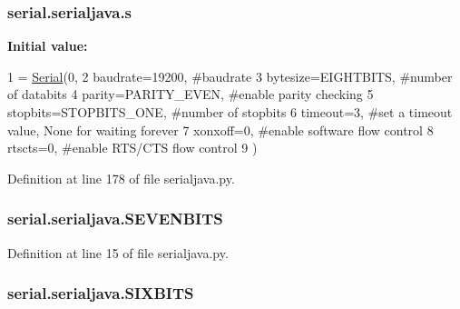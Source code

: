 \subsubsection[{\texorpdfstring{s}{s}}]{\setlength{\rightskip}{0pt plus 5cm}serial.\+serialjava.\+s}\hypertarget{namespaceserial_1_1serialjava_aa3340e982508ffb757dae29fd0a7c21c}{}\label{namespaceserial_1_1serialjava_aa3340e982508ffb757dae29fd0a7c21c}
{\bfseries Initial value\+:}
\begin{DoxyCode}
1 = \hyperlink{classserial_1_1serialjava_1_1_serial}{Serial}(0,
2                  baudrate=19200,        \textcolor{comment}{#baudrate}
3                  bytesize=EIGHTBITS,    \textcolor{comment}{#number of databits}
4                  parity=PARITY\_EVEN,    \textcolor{comment}{#enable parity checking}
5                  stopbits=STOPBITS\_ONE, \textcolor{comment}{#number of stopbits}
6                  timeout=3,             \textcolor{comment}{#set a timeout value, None for waiting forever}
7                  xonxoff=0,             \textcolor{comment}{#enable software flow control}
8                  rtscts=0,              \textcolor{comment}{#enable RTS/CTS flow control}
9                )
\end{DoxyCode}


Definition at line 178 of file serialjava.\+py.

\subsubsection[{\texorpdfstring{S\+E\+V\+E\+N\+B\+I\+TS}{SEVENBITS}}]{\setlength{\rightskip}{0pt plus 5cm}serial.\+serialjava.\+S\+E\+V\+E\+N\+B\+I\+TS}\hypertarget{namespaceserial_1_1serialjava_ab70ba3f1071d56f05dc5c42588c15dbe}{}\label{namespaceserial_1_1serialjava_ab70ba3f1071d56f05dc5c42588c15dbe}


Definition at line 15 of file serialjava.\+py.

\subsubsection[{\texorpdfstring{S\+I\+X\+B\+I\+TS}{SIXBITS}}]{\setlength{\rightskip}{0pt plus 5cm}serial.\+serialjava.\+S\+I\+X\+B\+I\+TS}\hypertarget{namespaceserial_1_1serialjava_a912f4518d75bc732a613ded3e5691c64}{}\label{namespaceserial_1_1serialjava_a912f4518d75bc732a613ded3e5691c64}


